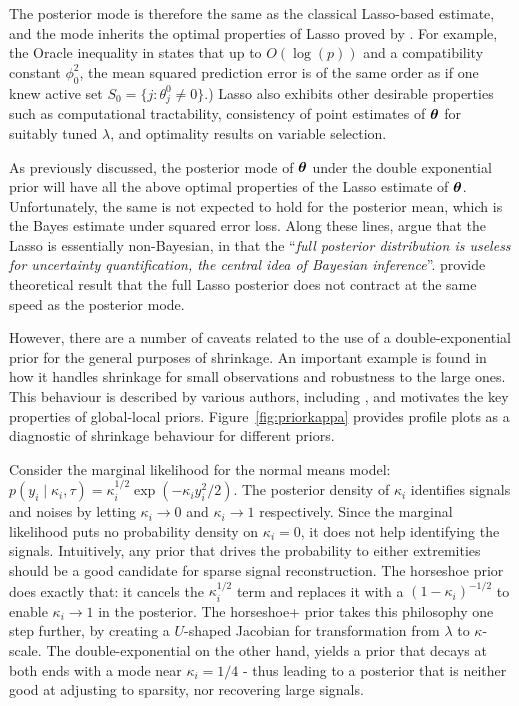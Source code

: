 \documentclass[11pt]{article}
\begin{document}
The posterior mode is therefore	the	 same as the classical Lasso-based
estimate, and the mode inherits the optimal properties of Lasso proved by
\cite{buhlmann2011statistics}. For example, the Oracle inequality in \citet[Eq.
(2.8), Th. (6.1)]{buhlmann2011statistics} states that up to $O(\log(p))$ and a
compatibility constant $\phi_0^2$, the mean squared prediction error is of the
same order as if one knew active set $S_0 = \{j : \theta_j^0 \neq 0 \}$.)
Lasso also exhibits other desirable properties such as computational
tractability, consistency of point estimates of $\boldsymbol{\theta}$ for suitably tuned
$\lambda$, and optimality results on variable selection. 

As previously discussed, the posterior mode of $\boldsymbol{\theta}$ under the double
exponential prior will have all the above optimal properties of the Lasso
estimate of $\boldsymbol{\theta}$. Unfortunately, the same is not expected to hold for the
posterior mean, which is the Bayes estimate under squared error loss. Along
these lines, \citet{castillo2015bayesian} argue that the Lasso is essentially
non-Bayesian, in that the ``\textsl{full posterior distribution is useless for
uncertainty quantification, the central idea of Bayesian inference}''.
\citet{castillo2015bayesian} provide theoretical result that the full Lasso
posterior does not contract at the same speed as the posterior mode. 

However, there are a number of caveats related to the use of a
double-exponential prior for the general purposes of shrinkage.  An important
example is found in how it handles shrinkage for small observations and
robustness to the large ones.  This behaviour is described by various authors,
including \cite{polson2010shrink,datta2013asymptotic}, and motivates the key
properties of global-local priors. Figure~\ref{fig:priorkappa} provides
profile plots as a diagnostic of shrinkage behaviour for different
priors.

Consider the marginal likelihood for the normal means model: $p(y_i \mid
\kappa_i, \tau) = \kappa_i^{1/2} \exp \left(-\kappa_i y_i^2/2 \right)$. The
posterior density of $\kappa_i$ identifies signals and noises by letting
$\kappa_i \to 0$ and $\kappa_i \to 1$ respectively. Since the marginal
likelihood puts no probability density on $\kappa_i = 0$, it does not help
identifying the signals. Intuitively, any prior that drives the probability to
either extremities should be a good candidate for sparse signal reconstruction.
The horseshoe prior does exactly that: it cancels the $\kappa_i^{1/2}$ term and
replaces it with a $(1-\kappa_i)^{-1/2}$ to enable $\kappa_i \to 1$ in the
posterior. The horseshoe+ prior takes this philosophy one step further, by
creating a $U$-shaped Jacobian for transformation from $\lambda$ to
$\kappa$-scale. The double-exponential on the other hand, yields a prior that
decays at both ends with a mode near $\kappa_i = 1/4$ - thus leading to a
posterior that is neither good at adjusting to sparsity, nor recovering large
signals. 
\end{document}
